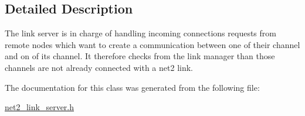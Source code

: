 \subsection{Detailed Description}
The link server is in charge of handling incoming connections requests from remote nodes which want to create a communication between one of their channel and on of its channel. It therefore checks from the link manager than those channels are not already connected with a net2 link. 

The documentation for this class was generated from the following file\-:\begin{DoxyCompactItemize}
\item 
\hyperlink{net2__link__server_8h}{net2\-\_\-link\-\_\-server.\-h}\end{DoxyCompactItemize}
